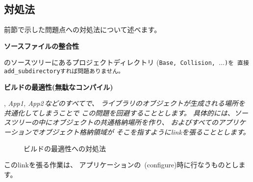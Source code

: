 \subsection{対処法}
\label{subsec:Solution}

\noindent
前節で示した問題点への対処法について述べます。

\bigskip
\noindent
\bf{ソースファイルの整合性}
\begin{narrow}[20pt]
	\SprLib のソースツリーにあるプロジェクトディレクトリ
	(\tt{Base}, \tt{Collision}, $\ldots$)を
	直接\tt{add\_subdirectory}すれば問題ありません。
\end{narrow}

\medskip
\noindent
\bf{ビルドの最適性(無駄なコンパイル)}
\begin{narrow}[20pt]
	\SprLib, \it{App1, App2\,}などのすべてで、
	ライブラリのオブジェクトが生成される場所を共通化してしまうことで
	この問題を回避することとします。
	具体的には、\SprLib ソースツリーの中にオブジェクトの共通格納場所を作り、
	\SprLib およびすべてのアプリケーションでオブジェクト格納領域が
	そこを指すようにlinkを張ることとします。

	\begin{figure}[h]
    	\begin{narrow}[40pt]\begin{minipage}{\textwidth}
		{\footnotesize{}}
		\medskip
    	\end{minipage}\end{narrow}
    	\begin{narrow}[40pt]\begin{minipage}{\textwidth}
		{\footnotesize{}}
		\medskip
  	\end{minipage}\end{narrow}
	\caption{ビルドの最適性への対処法}
	\label{fig:SolutionToBuildOptimization}
	\end{figure}
	\indent
	このlinkを張る作業は、
	アプリケーションの\cmake\ (configure)時に行なうものとします。
\end{narrow}

